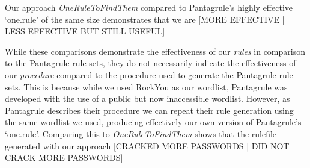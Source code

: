 \documentclass[letterpaper,twocolumn,10pt]{article}
\begin{document}
Our approach \textit{OneRuleToFindThem} compared to Pantagrule's highly
effective `one.rule' of
the same size demonstrates that we are [MORE EFFECTIVE | LESS EFFECTIVE BUT STILL USEFUL]

While these comparisons demonstrate the effectiveness of our \textit{rules} in
comparison to the Pantagrule rule sets, they do not necessarily indicate the
effectiveness of our \textit{procedure} compared to the procedure used to
generate the Pantagrule rule sets. This is because while we used RockYou as our
wordlist, Pantagrule was developed with the use of a public but now
inaccessible wordlist. However, as Pantagrule describes their procedure we can
repeat their rule generation using the same wordlist we used, producing
effectively our own version of Pantagrule's `one.rule'. Comparing this to
\textit{OneRuleToFindThem} shows that the rulefile generated with our approach
[CRACKED MORE PASSWORDS | DID NOT CRACK MORE PASSWORDS]

\end{document}
